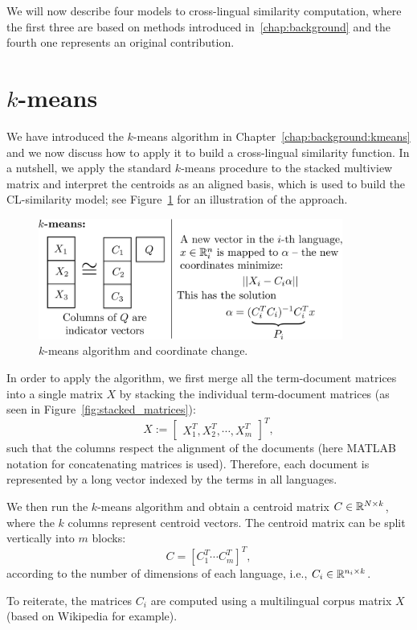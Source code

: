 We will now describe four models to cross-lingual similarity computation, where the first three are based on
methods introduced in~\ref{chap:background} and the fourth one represents an original contribution.
\section{$k$-means}\label{chap:crosslingual:kmeans}

We have introduced the $k$-means algorithm in Chapter~\ref{chap:background:kmeans} and we now discuss
how to apply it to build a cross-lingual similarity function. In a nutshell, we apply the standard
$k$-means procedure to the stacked multiview matrix and interpret the centroids as an aligned basis, which
is used to build the CL-similarity model; see Figure~\ref{fig:kmeans} for an illustration of the approach.

\begin{figure}[tbp]
\centering
\includegraphics[width=10cm]{figures/kmeans.pdf}
\caption{\label{fig:kmeans} $k$-means algorithm and coordinate change.}
\end{figure}

In order to apply the algorithm, we first merge all the term-document matrices into a single matrix
$X$ by stacking the individual term-document matrices (as seen in Figure~\ref{fig:stacked_matrices}):
$$X := \begin{bmatrix}X_1^T ,X_2^T, \cdots, X_m^T \end{bmatrix}^T,$$
such that the columns respect the alignment of the documents (here MATLAB notation for concatenating
matrices is used). Therefore, each document is represented by a long vector indexed by the terms in all languages.

We then run the $k$-means algorithm and obtain a centroid matrix $C \in \mathbb{R}^{N \times k}$,
where the $k$ columns represent centroid vectors. The centroid matrix can be split vertically into $m$
blocks: $$C = [C_1^T \cdots C_m^T]^T,$$ according to the number of dimensions of each language,
i.e., $C_i \in \mathbb{R}^{n_i \times k}$.

To reiterate, the matrices $C_i$ are computed using a multilingual corpus
matrix $X$ (based on Wikipedia for example).

